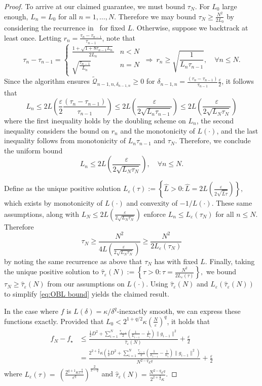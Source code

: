 \documentclass[11pt, hidelinks]{article}
\numberwithin{equation}{section}
\theoremstyle{thmstyletwo}%
\numberwithin{equation}{section}
\newcommand{\eps}{\varepsilon}
\begin{document}
\begin{proof}
To arrive at our claimed guarantee, we must bound $\tau_N$. For $L_0$ large enough, $L_n = L_0$ for all $n = 1, \dots, N$. Therefore we may bound $\tau_N \geq \frac{N^2}{2L_0}$ by considering the recurrence in~\cite[Corollary 5]{OBL} for fixed $L$. Otherwise, suppose we backtrack at least once. Letting $r_n = \frac{\tau_n-\tau_{n-1}}{\tau_{n-1}}$, note that
$$\tau_n-\tau_{n-1} = \begin{cases} \frac{1+\sqrt{1+8\tau_{n-1}L_n}}{2L_n} & n < N\\
\sqrt{\frac{\tau_{n-1}}{L_n}} & n = N\end{cases} \ \Longrightarrow \ r_n \geq \sqrt{\frac{1}{L_n\tau_{n-1}}}, \quad  \forall n \leq N.$$
Since the algorithm ensures $\tilde{\mathcal{Q}}_{n-1,n,\delta_{n-1,n}}  \geq 0$ for $\delta_{n-1,n}=\frac{(\tau_n-\tau_{n-1})}{\tau_{n-1}}\frac{\eps}{2}$, it follows that $$L_{n} \leq 2L\left(\frac{\eps}{2}\frac{(\tau_n-\tau_{n-1})}{\tau_{n-1}}\right) \leq 2L\left(\frac{\eps}{2\sqrt{L_n\tau_{n-1}}}\right)\leq 2L\left(\frac{\eps}{2\sqrt{L_N\tau_N}}\right)$$
where the first inequality holds by the doubling scheme on $L_n$, the second inequality considers the bound on $r_n$ and the monotonicity of $L(\cdot)$, and the last inequality follows from monotonicity of $L_n\tau_{n-1}$ and $\tau_N$.
Therefore, we conclude the uniform bound $$L_n \leq  2L\left(\frac{\eps}{2\sqrt{L_N\tau_N}}\right), \quad \forall n \leq N.$$

Define as the unique positive solution $L_\eps(\tau) := \left\{\hat{L} > 0 : \hat{L} = 2L\left(\frac{\eps}{2\sqrt{\hat{L}\tau}}\right)\right\},$ which exists by monotonicity of $L(\cdot)$ and convexity of $-1/L(\cdot)$. These same assumptions, along with $L_N \leq 2L\left(\frac{\eps}{2\sqrt{L_N\tau_N}}\right)$ enforce $L_n \leq L_\eps(\tau_N)$ for all $n \leq N$. Therefore $$\tau_N \geq \frac{N^2}{ 4L\left(\frac{\eps}{2\sqrt{L_N\tau_N}}\right)} \geq \frac{N^2}{2L_\eps(\tau_N)}$$ by noting the same recurrence as above that $\tau_N$ has with fixed $L$.
Finally, taking the unique positive solution to $\hat{\tau}_\eps(N) := \left\{\tau > 0 : \tau = \frac{N^2}{2L_\eps(\tau)}\right\},$ we bound $\tau_N \geq \hat{\tau}_\eps(N)$ from our assumptions on $L(\cdot)$. Using $\hat{\tau}_\eps(N)$ and $L_\eps(\hat{\tau}_\eps(N))$ to simplify \eqref{eq:OBL bound} yields the claimed result.

In the case where $f$ is $L(\delta) = \kappa/\delta^q$-inexactly smooth, we can express these functions exactly. Provided that $L_0 < 2^{1+q/2}\kappa\left(\frac{N}{\eps}\right)^{q}$, it holds that
\begin{align*}
    f_N-f_\star &\leq \frac{\frac{1}{2}D^2 + \sum_{i=1}^N \frac{\tau_{i-1}}{2}\left(\frac{1}{L_{i-1}}-\frac{1}{L_i}\right)\|g_{i-1}\|^2 }{\hat{\tau}_\eps(N)}+\frac{\eps}{2}\\
    &=\frac{2^{2+\frac{q}{2}}\kappa\left(\frac{1}{2}D^2 + \sum_{i=1}^N \frac{\tau_{i-1}}{2}\left(\frac{1}{L_{i-1}}-\frac{1}{L_i}\right)\|g_{i-1}\|^2\right) }{N^{2-q}\eps^{q}}+\frac{\eps}{2}
\end{align*}
where
$L_\eps(\tau) = \ \left(\frac{2^{q+1} \kappa \tau^{\frac{q}{2}}}{\eps^q}\right)^\frac{2}{2-q}$ and $\hat{\tau}_\eps(N) = \frac{N^{2-q}\eps^q}{2^{2+\frac{q}{2}}\kappa}$.
\end{proof}
\end{document}
